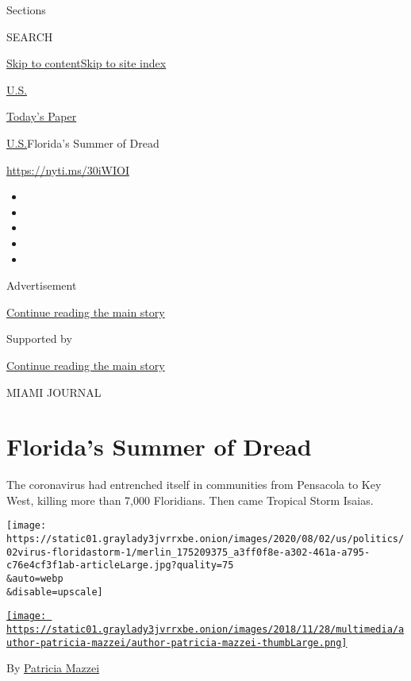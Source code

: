 Sections

SEARCH

\protect\hyperlink{site-content}{Skip to
content}\protect\hyperlink{site-index}{Skip to site index}

\href{https://www.nytimes3xbfgragh.onion/section/us}{U.S.}

\href{https://myaccount.nytimes3xbfgragh.onion/auth/login?response_type=cookie\&client_id=vi}{}

\href{https://www.nytimes3xbfgragh.onion/section/todayspaper}{Today's
Paper}

\href{/section/us}{U.S.}\textbar{}Florida's Summer of Dread

\url{https://nyti.ms/30iWIOI}

\begin{itemize}
\item
\item
\item
\item
\item
\end{itemize}

Advertisement

\protect\hyperlink{after-top}{Continue reading the main story}

Supported by

\protect\hyperlink{after-sponsor}{Continue reading the main story}

MIAMI JOURNAL

\hypertarget{floridas-summer-of-dread}{%
\section{Florida's Summer of Dread}\label{floridas-summer-of-dread}}

The coronavirus had entrenched itself in communities from Pensacola to
Key West, killing more than 7,000 Floridians. Then came Tropical Storm
Isaias.

\texttt{[image: https://static01.graylady3jvrrxbe.onion/images/2020/08/02/us/politics/02virus-floridastorm-1/merlin\_175209375\_a3ff0f8e-a302-461a-a795-c76e4cf3f1ab-articleLarge.jpg?quality=75\\\&auto=webp\\\&disable=upscale]}

\href{https://www.nytimes3xbfgragh.onion/by/patricia-mazzei}{\texttt{[image: https://static01.graylady3jvrrxbe.onion/images/2018/11/28/multimedia/author-patricia-mazzei/author-patricia-mazzei-thumbLarge.png]}}

By \href{https://www.nytimes3xbfgragh.onion/by/patricia-mazzei}{Patricia
Mazzei}

